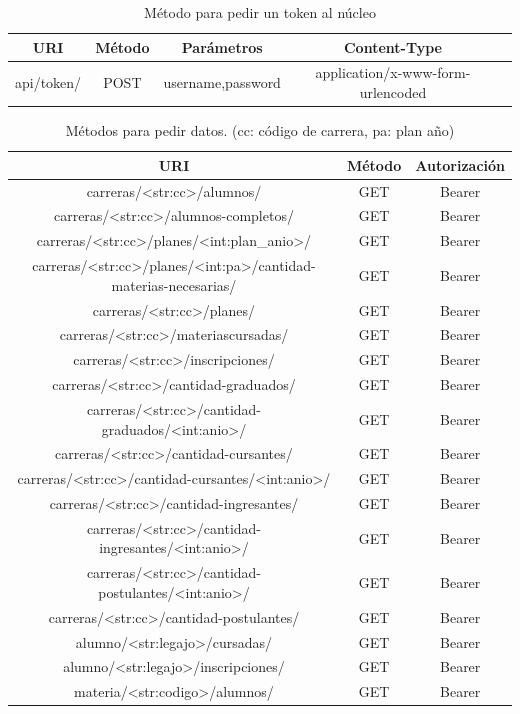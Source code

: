 \begin{table}[!htbp]
    \centering
    \makegapedcells
    \begin{tabular}{|c|c|c|c|c|}
    \hline
    URI & Método & Parámetros & Content-Type \\ \hline
    api/token/ & POST & username,password & application/x-www-form-urlencoded \\ \hline
    \end{tabular}
    \caption{Método para pedir un token al núcleo}
    \label{tab:tabla_token}
\end{table}

\begin{table}[!htbp]
    \centering
    \makegapedcells
    \begin{tabular}{|c|c|c|}
    \hline
    URI & Método & Autorización\\ \hline
    carreras/<str:cc>/alumnos/ & GET & Bearer  \\ \hline
    carreras/<str:cc>/alumnos-completos/ & GET & Bearer  \\ \hline
    carreras/<str:cc>/planes/<int:plan\_anio>/ & GET & Bearer  \\ \hline
    carreras/<str:cc>/planes/<int:pa>/cantidad-materias-necesarias/ & GET & Bearer  \\ \hline
    carreras/<str:cc>/planes/ & GET & Bearer  \\ \hline
    carreras/<str:cc>/materiascursadas/ & GET & Bearer  \\ \hline
    carreras/<str:cc>/inscripciones/ & GET & Bearer  \\ \hline
    carreras/<str:cc>/cantidad-graduados/ & GET & Bearer  \\ \hline
    carreras/<str:cc>/cantidad-graduados/<int:anio>/ & GET & Bearer  \\ \hline
    carreras/<str:cc>/cantidad-cursantes/ & GET & Bearer  \\ \hline
    carreras/<str:cc>/cantidad-cursantes/<int:anio>/ & GET & Bearer  \\ \hline
    carreras/<str:cc>/cantidad-ingresantes/ & GET & Bearer  \\ \hline
    carreras/<str:cc>/cantidad-ingresantes/<int:anio>/ & GET & Bearer  \\ \hline
    carreras/<str:cc>/cantidad-postulantes/<int:anio>/ & GET & Bearer  \\ \hline
    carreras/<str:cc>/cantidad-postulantes/ & GET & Bearer  \\ \hline
    alumno/<str:legajo>/cursadas/ & GET & Bearer  \\ \hline
    alumno/<str:legajo>/inscripciones/ & GET & Bearer  \\ \hline
    materia/<str:codigo>/alumnos/ & GET & Bearer  \\ \hline
    \end{tabular}
    \caption{Métodos para pedir datos. (cc: código de carrera, pa: plan año)}
    \label{tab:tabla_api}
\end{table}

